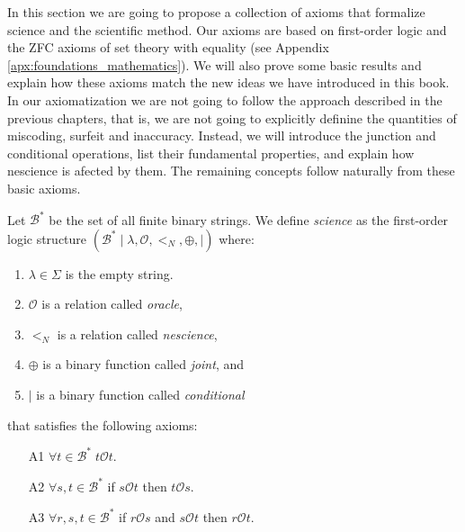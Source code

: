 In this section we are going to propose a collection of axioms that formalize science and the scientific method. Our axioms are based on first-order logic and the ZFC axioms of set theory with equality (see Appendix \ref{apx:foundations_mathematics}). We will also prove some basic results and explain how these axioms match the new ideas we have introduced in this book. In our axiomatization we are not going to follow the approach described in the previous chapters, that is, we are not going to explicitly definine the quantities of miscoding, surfeit and inaccuracy. Instead, we will introduce the junction and conditional operations, list their fundamental properties, and explain how nescience is afected by them. The remaining concepts follow naturally from these basic axioms.

\begin{definition}

Let $\mathcal{B}^\ast$ be the set of all finite binary strings. We define \emph{science} as the first-order logic structure $(\mathcal{B}^\ast \mid \lambda, \mathcal{O}, <_N, \oplus, \mid)$ where:

\vskip 0.25cm

\begin{enumerate}[label=(\roman*)]
\item $\lambda \in \Sigma$ is the empty string.
\item $\mathcal{O}$ is a relation called \emph{oracle},
\item $<_N$ is a relation called \emph{nescience},
\item $\oplus$ is a binary function called \emph{joint}, and
\item $\mid$ is a binary function called \emph{conditional}
\end{enumerate}

\vskip 0.25cm

that satisfies the following axioms:

\vskip 0.25cm

\begin{itemize}

\item[A1] $\forall t \in \mathcal{B}^\ast \; t \mathcal{O} t$.
\item[A2] $\forall s , t \in \mathcal{B}^\ast$ if $s \mathcal{O} t$ then $t \mathcal{O} s$.
\item[A3] $\forall r, s , t \in \mathcal{B}^\ast$ if $r \mathcal{O} s$ and $s \mathcal{O} t$ then $r \mathcal{O} t$.

\vskip 0.25cm


\end{itemize}
\end{definition}
